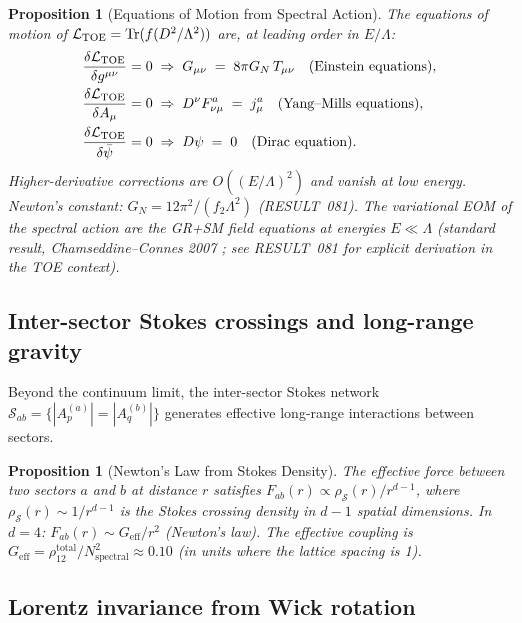\documentclass[12pt]{article}
\newtheorem{proposition}[theorem]{Proposition}
\theoremstyle{definition}
\theoremstyle{remark}
\begin{document}
\begin{proposition}[Equations of Motion from Spectral Action]\label{prop:eom}
The equations of motion of $\mathcal{L}_{\rm TOE} = \mathrm{Tr}(f(D^2/\Lambda^2))$
are, at leading order in $E/\Lambda$:
\begin{align}
\frac{\delta \mathcal{L}_{\rm TOE}}{\delta g^{\mu\nu}} = 0
  &\;\Rightarrow\;
  G_{\mu\nu} \;=\; 8\pi G_N\,T_{\mu\nu}
  \quad\text{(Einstein equations)},
  \label{eq:einstein}\\
\frac{\delta \mathcal{L}_{\rm TOE}}{\delta A_\mu} = 0
  &\;\Rightarrow\;
  D^\nu F_{\nu\mu}^a \;=\; j_\mu^a
  \quad\text{(Yang--Mills equations)},
  \label{eq:YM}\\
\frac{\delta \mathcal{L}_{\rm TOE}}{\delta \bar\psi} = 0
  &\;\Rightarrow\;
  D\psi \;=\; 0
  \quad\text{(Dirac equation)}.
  \label{eq:Dirac}
\end{align}
Higher-derivative corrections are $O((E/\Lambda)^2)$ and vanish at low energy.
Newton's constant: $G_N = 12\pi^2/(f_2\Lambda^2)$ (RESULT~081).
The variational EOM of the spectral action are the GR+SM field equations at
energies $E\ll\Lambda$ (standard result, Chamseddine--Connes 2007
\cite{ConnesChamseddine1997}; see RESULT~081 for explicit derivation in the
TOE context).
\end{proposition}

\subsection{Inter-sector Stokes crossings and long-range gravity}

Beyond the continuum limit, the inter-sector Stokes network
$\mathcal{S}_{ab} = \{|A_p^{(a)}| = |A_q^{(b)}|\}$ generates
effective long-range interactions between sectors.

\begin{proposition}[Newton's Law from Stokes Density]
The effective force between two sectors $a$ and $b$ at distance $r$
satisfies $F_{ab}(r) \propto \rho_\mathcal{S}(r)/r^{d-1}$, where
$\rho_\mathcal{S}(r) \sim 1/r^{d-1}$ is the Stokes crossing density
in $d-1$ spatial dimensions.
In $d=4$: $F_{ab}(r) \sim G_\mathrm{eff}/r^2$ (Newton's law).
The effective coupling is
$G_\mathrm{eff} = \rho_{12}^\mathrm{total}/N_\mathrm{spectral}^2 \approx 0.10$
(in units where the lattice spacing is 1).
\end{proposition}

\subsection{Lorentz invariance from Wick rotation}
\end{document}
